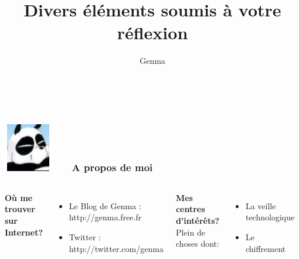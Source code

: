\documentclass{beamer}
\title[Divers éléments soumis à votre réflexion]{Divers éléments soumis à votre réflexion}
\author{Genma}
\begin{document}
\begin{frame}
\titlepage
\vfill
\begin{center}
\\[2.5ex]
{\tiny\CcNote{\CcLongnameByNcSa}}
\vspace*{-2.5ex}
\end{center}
\end{frame}
\begin{frame}
\frametitle{\includegraphics[scale=0.4]{./images/Genma.jpg} \ \ \ A propos de moi }
\begin{columns}[c]
\textbf{Où me trouver sur Internet?}
\begin{itemize}
\item Le Blog de Genma : http://genma.free.fr
\item Twitter : http://twitter.com/genma
\end{itemize}
\textbf{Mes centres d'intérêts?}
\\ Plein de choses dont:
\begin{itemize}
\item La veille technologique
\item Le chiffrement
\end{itemize}
\includegraphics[width=5cm,height=5cm]{./images/blog.png}
\end{columns}
\end{frame}
\end{document}
